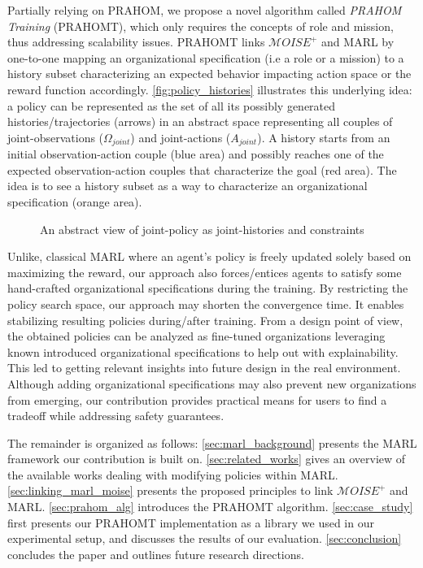 \documentclass[sigconf,anonymous]{aamas}
\begin{document}
Partially relying on PRAHOM, we propose a novel algorithm called \textit{PRAHOM Training} (PRAHOMT), which only requires the concepts of role and mission, thus addressing scalability issues.
PRAHOMT links $\mathcal{M}OISE^+$ and MARL by one-to-one mapping an organizational specification (i.e a role or a mission) to a history subset characterizing an expected behavior impacting action space or the reward function accordingly.
%
\autoref{fig:policy_histories} illustrates this underlying idea: a policy can be represented as the set of all its possibly generated histories/trajectories (arrows) in an abstract space representing all couples of joint-observations ($\Omega_{joint}$) and joint-actions ($A_{joint}$). A history starts from an initial observation-action couple (blue area) and possibly reaches one of the expected observation-action couples that characterize the goal (red area). The idea is to see a history subset as a way to characterize an organizational specification (orange area).

\begin{figure}[h!]
  \centering
  
  \caption{An abstract view of joint-policy as joint-histories and constraints}
  \label{fig:policy_histories}
\end{figure}

Unlike, classical MARL where an agent's policy is freely updated solely based on maximizing the reward, our approach also forces/entices agents to satisfy some hand-crafted organizational specifications during the training. By restricting the policy search space, our approach may shorten the convergence time. It enables stabilizing resulting policies during/after training. From a design point of view, the obtained policies can be analyzed as fine-tuned organizations leveraging known introduced organizational specifications to help out with explainability. This led to getting relevant insights into future design in the real environment. Although adding organizational specifications may also prevent new organizations from emerging, our contribution provides practical means for users to find a tradeoff while addressing safety guarantees.

The remainder is organized as follows: \autoref{sec:marl_background} presents the MARL framework our contribution is built on. \autoref{sec:related_works} gives an overview of the available works dealing with modifying policies within MARL. \autoref{sec:linking_marl_moise} presents the proposed principles to link $\mathcal{M}OISE^+$ and MARL. \autoref{sec:prahom_alg} introduces the PRAHOMT algorithm. \autoref{sec:case_study} first presents our PRAHOMT implementation as a library we used in our experimental setup, and discusses the results of our evaluation. \autoref{sec:conclusion} concludes the paper and outlines future research directions.
\end{document}
